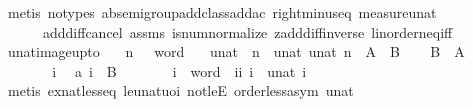 \begin{isabellebody}
\isatagproof
{}\isamarkupfalse%
\ {\isacharparenleft}metis\ {\isacharparenleft}no{\isacharunderscore}types{\isacharparenright}\ ab{\isacharunderscore}semigroup{\isacharunderscore}add{\isacharunderscore}class{\isachardot}add{\isacharunderscore}ac{\isacharparenleft}{}{\isacharparenright}\ right{\isacharunderscore}minus{\isacharunderscore}eq\ measure{\isacharunderscore}unat\isanewline
\ \ \ \ \ \ add{\isacharunderscore}diff{\isacharunderscore}cancel{}\ assms\ is{\isacharunderscore}num{\isacharunderscore}normalize{\isacharparenleft}{}{\isacharparenright}\ zadd{\isacharunderscore}diff{\isacharunderscore}inverse\ linorder{\isacharunderscore}neq{\isacharunderscore}iff{\isacharparenright}%
\endisatagproof
{\isafoldproof}%
%
\isadelimproof
\isanewline
%
\endisadelimproof
\isanewline
{}\isamarkupfalse%
\ unat{\isacharunderscore}image{\isacharunderscore}upto{\isacharcolon}\isanewline
\ \ \ n\ {\isacharcolon}{\isacharcolon}\ {\isachardoublequoteopen}{}{}\ word{\isachardoublequoteclose}\isanewline
\ \ \ {\isachardoublequoteopen}unat\ {\isacharbackquote}\ {\isacharbraceleft}{}{\isachardot}{\isachardot}{\isacharless}n{\isacharbraceright}\ {\isacharequal}\ {\isacharbraceleft}unat\ {}{\isachardot}{\isachardot}{\isacharless}unat\ n{\isacharbraceright}{\isachardoublequoteclose}\ {\isacharparenleft}\ {\isachardoublequoteopen}{\isacharquery}A\ {\isacharequal}\ {\isacharquery}B{\isachardoublequoteclose}{\isacharparenright}\isanewline
%
\isadelimproof
%
\endisadelimproof
%
\isatagproof
{}\isamarkupfalse%
\isanewline
\ \ \isamarkupfalse%
\ {\isachardoublequoteopen}{\isacharquery}B\ {\isasymsubseteq}\ {\isacharquery}A{\isachardoublequoteclose}\ \ \isanewline
\ \ \isamarkupfalse%
\ \isanewline
\ \ \ \ \isamarkupfalse%
\ i\ \isamarkupfalse%
\ a{\isacharcolon}\ {\isachardoublequoteopen}i\ {\isasymin}\ {\isacharquery}B{\isachardoublequoteclose}\isanewline
\ \ \ \ \isamarkupfalse%
\ \isamarkupfalse%
\ i{\isacharprime}{\isacharcolon}{\isacharcolon}\ {\isachardoublequoteopen}{}{}\ word{\isachardoublequoteclose}\ \ ii{\isacharcolon}\ {\isachardoublequoteopen}i{\isacharequal}\ \ unat\ i{\isacharprime}{\isachardoublequoteclose}\isanewline
\ \ \ \ \ \ \isamarkupfalse%
\ {\isacharparenleft}metis\ ex{\isacharunderscore}nat{\isacharunderscore}less{\isacharunderscore}eq\ le{\isacharunderscore}unat{\isacharunderscore}uoi\ not{\isacharunderscore}leE\ order{\isacharunderscore}less{\isacharunderscore}asym\ unat{\isacharunderscore}{}{\isacharparenright}\isanewline

\end{isabellebody}
